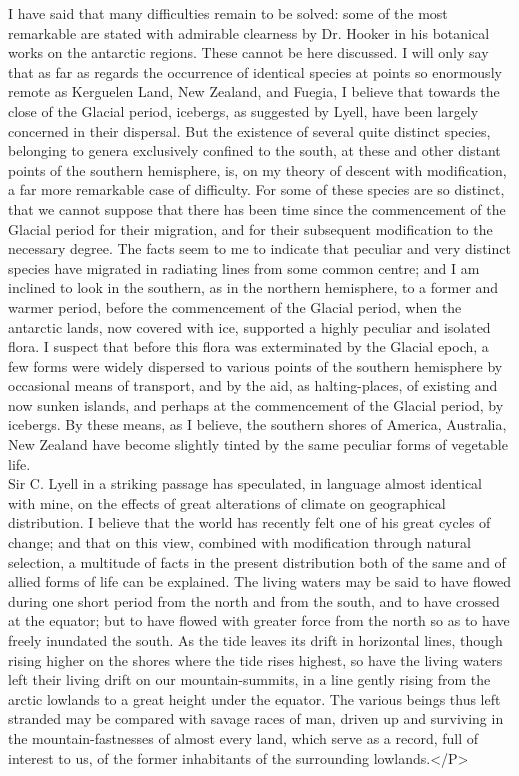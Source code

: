 \indent I have said that many difficulties remain to be solved: some of the most remarkable are stated with admirable clearness by Dr. Hooker in his botanical works on the antarctic regions. These cannot be here discussed. I will only say that as far as regards the occurrence of identical species at points so enormously remote as Kerguelen Land, New Zealand, and Fuegia, I believe that towards the close of the Glacial period, icebergs, as suggested by Lyell, have been largely concerned in their dispersal. But the existence of several quite distinct species, belonging to genera exclusively confined to the south, at these and other distant points of the southern hemisphere, is, on my theory of descent with modification, a far more remarkable case of difficulty. For some of these species are so distinct, that we cannot suppose that there has been time since the commencement of the Glacial period for their migration, and for their subsequent modification to the necessary degree. The facts seem to me to indicate that peculiar and very distinct species have migrated in radiating lines from some common centre; and I am inclined to look in the southern, as in the northern hemisphere, to a former and warmer period, before the commencement of the Glacial period, when the antarctic lands, now covered with ice, supported a highly peculiar and isolated flora. I suspect that before this flora was exterminated by the Glacial epoch, a few forms were widely dispersed to various points of the southern hemisphere by occasional means of transport, and by the aid, as halting-places, of existing and now sunken islands, and perhaps at the commencement of the Glacial period, by icebergs. By these means, as I believe, the southern shores of America, Australia, New Zealand have become slightly tinted by the same peculiar forms of vegetable life.~\\
\indent Sir C. Lyell in a striking passage has speculated, in language almost identical with mine, on the effects of great alterations of climate on geographical distribution. I believe that the world has recently felt one of his great cycles of change; and that on this view, combined with modification through natural selection, a multitude of facts in the present distribution both of the same and of allied forms of life can be explained. The living waters may be said to have flowed during one short period from the north and from the south, and to have crossed at the equator; but to have flowed with greater force from the north so as to have freely inundated the south.  As the tide leaves its drift in horizontal lines, though rising higher on the shores where the tide rises highest, so have the living waters left their living drift on our mountain-summits, in a line gently rising from the arctic lowlands to a great height under the equator. The various beings thus left stranded may be compared with savage races of man, driven up and surviving in the mountain-fastnesses of almost every land, which serve as a record, full of interest to us, of the former inhabitants of the surrounding lowlands.</P>